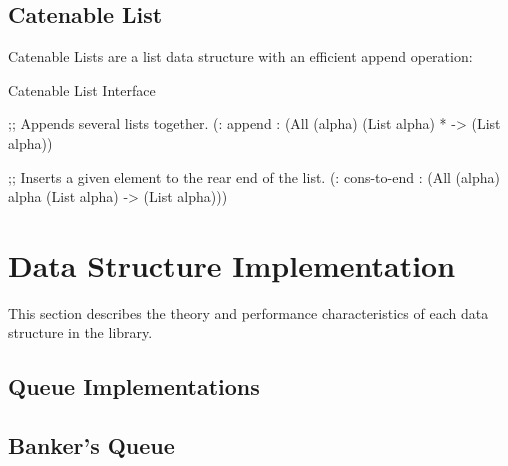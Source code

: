 \subsection*{Catenable List}
Catenable Lists are a list data structure with an efficient append
operation:

\begin{file}{Catenable List Interface}
  \begin{schemedisplay}

    ;; Appends several lists together.
    (: append : (All (alpha) (List alpha) * -> (List alpha))

    
    ;; Inserts a given element to the rear end of the list.
    (: cons-to-end : (All (alpha) alpha (List alpha) -> (List alpha)))

  \end{schemedisplay}
\end{file}



% 


 




\section{Data Structure Implementation}

This section describes the theory and performance characteristics of
each data structure in the library.

\subsection{Queue Implementations}

\subsection*{Banker's Queue}

